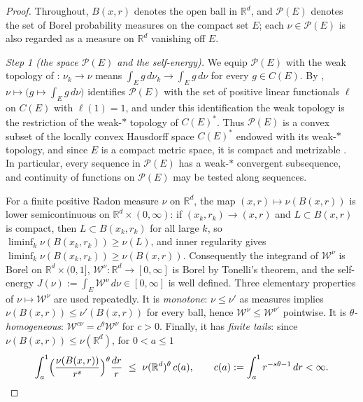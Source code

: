 \documentclass[12pt,oneside,a4paper]{article}
\theoremstyle{mytheorem}
\theoremstyle{remark}
\theoremstyle{definition}
\begin{document}
\begin{proof}
Throughout, $B(x,r)$ denotes the open ball in $\mathbb{R}^d$, and
$\mathcal{P}(E)$ denotes the set of Borel probability measures on the
compact set $E$; each $\nu\in\mathcal{P}(E)$ is also regarded as a
measure on $\mathbb{R}^d$ vanishing off $E$.

\smallskip\noindent\emph{Step 1 (the space $\mathcal{P}(E)$ and the
self-energy).}
We equip $\mathcal{P}(E)$ with the weak topology of
\cite[Ch.~II, \S6]{zbMATH03245885}: $\nu_k\to\nu$ means
$\int_Eg\,d\nu_k\to\int_Eg\,d\nu$ for every $g\in C(E)$.  By
\cite[Ch.~II, Thm.~5.8]{zbMATH03245885}, $\nu\mapsto\bigl(g\mapsto\int_Eg\,d\nu\bigr)$
identifies $\mathcal{P}(E)$ with the set of positive linear functionals
$\ell$ on $C(E)$ with $\ell(1)=1$, and under this identification the
weak topology is the restriction of the weak-\(*\) topology of $C(E)^*$.
Thus $\mathcal{P}(E)$ is a convex subset of the locally convex Hausdorff
space $C(E)^*$ endowed with its weak-\(*\) topology, and since $E$ is a compact metric
space, it is compact and metrizable
\cite[Ch.~II, Thm.~6.4]{zbMATH03245885}.  In particular, every sequence
in $\mathcal{P}(E)$ has a weak-\(*\) convergent subsequence, and
continuity of functions on $\mathcal{P}(E)$ may be tested along
sequences.

For a finite positive Radon measure $\nu$ on $\mathbb{R}^d$, the map
$(x,r)\longmapsto\nu(B(x,r))$ is lower semicontinuous on
$\mathbb{R}^d\times(0,\infty)$: if
$(x_k,r_k)\to(x,r)$ and
$L\subset B(x,r)$ is compact, then $L\subset B(x_k,r_k)$ for all large
$k$, so $\liminf_k\nu(B(x_k,r_k))\ge\nu(L)$, and inner regularity gives
$\liminf_k\nu(B(x_k,r_k))\ge\nu(B(x,r))$.  Consequently the integrand
of $\mathcal{W}^\nu$ is Borel on $\mathbb{R}^d\times(0,1]$,
$\mathcal{W}^\nu:\mathbb{R}^d\to[0,\infty]$ is Borel by Tonelli's
theorem, and the self-energy
$J(\nu):=\int_E\mathcal{W}^\nu\,d\nu\in[0,\infty]$ is well defined.
Three elementary properties of
$\nu\mapsto\mathcal{W}^\nu$ are used repeatedly.  It is
\emph{monotone}: $\nu\le\nu'$ as measures implies
$\nu(B(x,r))\le\nu'(B(x,r))$ for every ball, hence
$\mathcal{W}^\nu\le\mathcal{W}^{\nu'}$ pointwise.  It is
\emph{$\theta$-homogeneous}: $\mathcal{W}^{c\nu}=c^\theta\mathcal{W}^\nu$
for $c>0$.  Finally, it has \emph{finite tails}: since
$\nu(B(x,r))\le\nu(\mathbb{R}^d)$, for $0<a\le1$
\begin{equation}\label{eq:B-tail}
 \int_{a}^{1}\Bigl(\frac{\nu(B(x,r))}{r^s}\Bigr)^{\theta}\frac{dr}{r}
 \ \le\ \nu(\mathbb{R}^d)^\theta\,c(a),
 \qquad
 c(a):=\int_a^1r^{-s\theta-1}\,dr<\infty.
\end{equation}



\end{proof}
\end{document}
